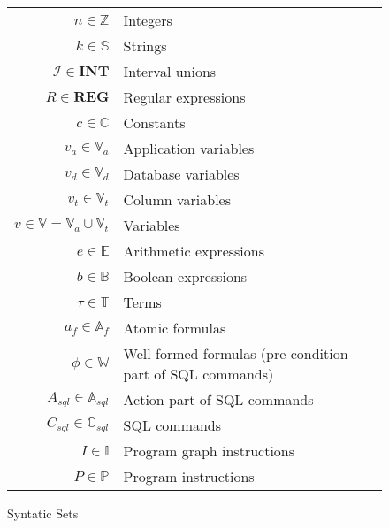 \begin{figure}[htb!]
    \center
    \begin{tabular}{r p{ }}
        $n \in \mathbb{Z}$                                  & Integers                                                  \\
        $k \in \mathbb{S}$                                  & Strings                                                   \\
        $\mathscr{I} \in \mathbf{INT}$                      & Interval unions                                           \\
        $R \in \mathbf{REG}$                                & Regular expressions                                       \\
        $c \in \mathbb{C}$                                  & Constants                                                 \\
        $v_a \in \mathbb{V}_a$                              & Application variables                                     \\
        $v_d \in \mathbb{V}_d$                              & Database variables                                        \\
        $v_t \in \mathbb{V}_t$                              & Column variables                                          \\
        $v \in \mathbb{V} = \mathbb{V}_a \cup \mathbb{V}_t$ & Variables                                                 \\
        $e \in \mathbb{E}$                                  & Arithmetic expressions                                    \\
        $b \in \mathbb{B}$                                  & Boolean expressions                                       \\
        $\tau \in \mathbb{T}$                               & Terms                                                     \\
        $a_f \in \mathbb{A}_f$                              & Atomic formulas                                           \\
        $\phi  \in \mathbb{W}$                                & Well-formed formulas (pre-condition part of SQL commands) \\
        $A_{sql} \in \mathbb{A}_{sql}$                      & Action part of SQL commands                               \\
        $C_{sql} \in \mathbb{C}_{sql}$                      & SQL commands                                              \\
        $I \in \mathbb{I}$                                  & Program graph instructions                                \\
        $P \in \mathbb{P}$                                  & Program instructions                                      \\
    \end{tabular}
    \caption{Syntatic Sets}
    \label{fig:syntatic-sets}
\end{figure}

